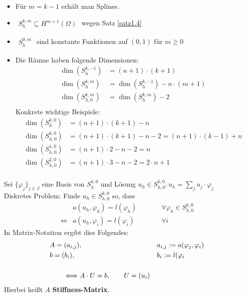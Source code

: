 \begin{bemerkung}\
	\begin{itemize}
		\item Für $m=k-1$ erhält man Splines.
		\item $\begin{aligned}
			S_h^{k,m}\subseteq H^{m+1}(\Omega)
		\end{aligned}$ wegen Satz \ref{satz1.4}
		\item $\begin{aligned}
			S_h^{0,m}
		\end{aligned}$ sind konstante Funktionen auf $(0,1)$ für $m\geq0$
		\item Die Räume haben folgende Dimensionen:
		\begin{align*}
			\dim\left(S_h^{k,-1}\right)&=(n+1)\cdot(k+1)\\
			\dim\left(S_h^{k,m}\right)&=\dim\left(S_h^{k,-1}\right)-n\cdot(m+1)\\
			\dim\left(S_{h,0}^{k,m}\right)&=\dim\left(S_h^{k,m}\right)-2\\
		\end{align*}
		Konkrete wichtige Beispiele:
		\begin{align*}
			\dim\left(S_h^{k,0}\right)&=(n+1)\cdot(k+1)-n\\
			\dim\left(S_{h,0}^{k,0}\right)&=(n+1)\cdot(k+1)-n-2=(n+1)\cdot(k-1)+n\\
			\dim\left(S_{h,0}^{1,0}\right)&=(n+1)\cdot 2-n-2=n\\
			\dim\left(S_{h,0}^{2,0}\right)&=(n+1)\cdot 3-n-2=2\cdot n+1\\
		\end{align*}
	\end{itemize}
\end{bemerkung}

Sei $\lbrace\varphi_j\rbrace_{j\in J}$ eine Basis von $S_h^{k,0}$
und Lösung $u_h\in S_{h,0}^{k,0}: u_h=\sum\limits_j u_j\cdot\varphi_j$\\
Diskretes Problem: Finde $u_h\in S_{h,0}^{k,0}$ so, dass
\begin{align*}
	&a(u_h,\varphi_h)=l(\varphi_h)&\qquad&\forall \varphi_h\in S_{h,0}^{k,0}\\
	\Longleftrightarrow &a(u_h,\varphi_i)=l(\varphi_i)&\qquad&\forall i
\end{align*}
In Matrix-Notation ergibt dies Folgendes:
\begin{align*}
	&A=(a_{i,j}),&&a_{i,j}:=a(\varphi_j,\varphi_i)\\
	&b=(b_i),&&b_i:=l(\varphi_i\nl
	&\qquad\Longleftrightarrow A\cdot U=b,\qquad U=(u_i)
\end{align*}
Hierbei heißt $A$ \textbf{Stiffness-Matrix}.

